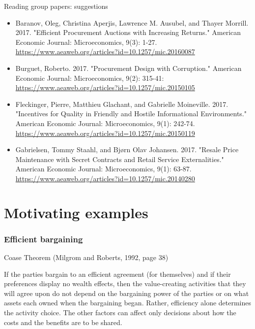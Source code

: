 \documentclass[11pt,english]{beamer}
\begin{document}
\begin{frame}{Reading group papers: suggestions}
  \begin{itemize}

  \item Baranov, Oleg, Christina Aperjis, Lawrence M. Ausubel, and Thayer Morrill. 2017. "Efficient Procurement Auctions with Increasing Returns." American Economic Journal: Microeconomics, 9(3): 1-27. \url{https://www.aeaweb.org/articles?id=10.1257/mic.20160087}
  \item Burguet, Roberto. 2017. "Procurement Design with Corruption." American Economic Journal: Microeconomics, 9(2): 315-41: \url{https://www.aeaweb.org/articles?id=10.1257/mic.20150105}
  \item Fleckinger, Pierre, Matthieu Glachant, and Gabrielle Moineville. 2017. "Incentives for Quality in Friendly and Hostile Informational Environments." American Economic Journal: Microeconomics, 9(1): 242-74. \url{https://www.aeaweb.org/articles?id=10.1257/mic.20150119}
  \item Gabrielsen, Tommy Staahl, and Bjørn Olav Johansen. 2017. "Resale Price Maintenance with Secret Contracts and Retail Service Externalities." American Economic Journal: Microeconomics, 9(1): 63-87. \url{https://www.aeaweb.org/articles?id=10.1257/mic.20140280}  
    
  \end{itemize}
\end{frame}

\part[lecture 1]{Motivating examples}

\section{Efficient bargaining}

\begin{frame}{Coase Theorem (Milgrom and Roberts,
    1992, page 38)}

If the parties bargain to an efficient agreement
(for themselves) and if their preferences display
no wealth effects, then the value-creating activities
that they will agree upon do not depend on the
bargaining power of the parties or on what assets
each owned when the bargaining began. Rather,
efficiency alone determines the activity choice.
The other factors can affect only decisions about
how the costs and the benefits are to be shared.
\end{frame}
\end{document}
